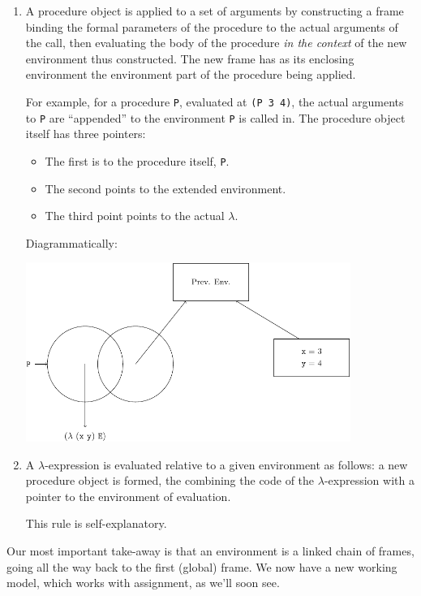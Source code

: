 \documentclass[9pt]{report}
\begin{document}
\begin{enumerate}
\item A procedure object is applied to a set of arguments by
constructing a frame binding the formal parameters of the
procedure to the actual arguments of the call, then evaluating
the body of the procedure \emph{in the context} of the new
environment thus constructed. The new frame has as its
enclosing environment the environment part of the procedure
being applied.

For example, for a procedure \texttt{P}, evaluated at \texttt{(P 3 4)}, the
actual arguments to \texttt{P} are ``appended'' to the environment \texttt{P}
is called in. The procedure object itself has three pointers:

\begin{itemize}
\item The first is to the procedure itself, \texttt{P}.
\item The second points to the extended environment.
\item The third point points to the actual \(\lambda\).
\end{itemize}

Diagrammatically:

\begin{center}
\includegraphics[width=300pt]{./images/rule1.pdf}
\end{center}

\item A \(\lambda\)-expression is evaluated relative to a given
environment as follows: a new procedure object is formed, the
combining the code of the \(\lambda\)-expression with a pointer to
the environment of evaluation.

This rule is self-explanatory.
\end{enumerate}

Our most important take-away is that an environment is a linked
chain of frames, going all the way back to the first (global)
frame. We now have a new working model, which works with
assignment, as we'll soon see.
\end{document}
